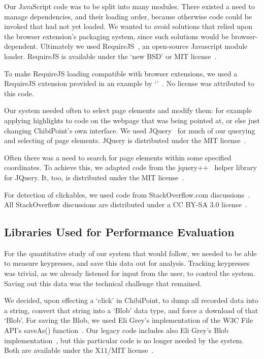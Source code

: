 \documentclass[11pt,openright,a4paper]{report}
\begin{document}
Our JavaScript code was to be split into many modules. There existed a need to manage dependencies, and their loading order, because otherwise code could be invoked that had not yet loaded. We wanted to avoid solutions that relied upon the browser extension's packaging system, since such solutions would be browser-dependent. Ultimately we used RequireJS~\cite{requirejs}, an open-source Javascript module loader. RequireJS is available under the `new BSD' or MIT license~\cite{requirejslicense,mitlicense}.

To make RequireJS loading compatible with browser extensions, we used a RequireJS extension provided in an example by `\citeauthor{requirejscs}'~\cite{requirejslicense}. No license was attributed to this code.

Our system needed often to select page elements and modify them: for example applying highlights to code on the webpage that was being pointed at, or else just changing ChibiPoint's own interface. We used JQuery~\cite{jquery} for much of our querying and selecting of page elements. JQuery is distributed under the MIT license~\cite{mitlicense}.

Often there was a need to search for page elements within some specified coordinates. To achieve this, we adapted code from the jquery++~\cite{jquerypp} helper library for JQuery. It, too, is distributed under the MIT license~\cite{mitlicense}.

For detection of clickables, we used code from StackOverflow.com discussions~\cite{eventlistenerprototype}. All StackOverflow discussions are distributed under a CC BY-SA 3.0 license~\cite{soverflowlicense}.

\subsection{Libraries Used for Performance Evaluation}
For the quantitative study of our system that would follow, we needed to be able to measure keypresses, and save this data out for analysis. Tracking keypresses was trivial, as we already listened for input from the user, to control the system. Saving out this data was the technical challenge that remained.

We decided, upon effecting a `click' in ChibiPoint, to dump all recorded data into a string, convert that string into a `Blob' data type, and force a download of that `Blob'. For saving the Blob, we used Eli Grey's implementation of the W3C File API's saveAs() function~\cite{filesaver}. Our legacy code includes also Eli Grey's Blob implementation~\cite{blob}, but this particular code is no longer needed by the system. Both are available under the X11/MIT license~\cite{x11license}.
\end{document}
